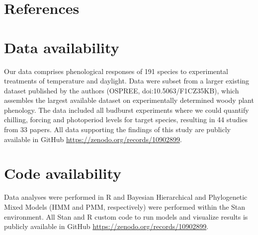 \documentclass{article}
\begin{document}
\clearpage


\section*{References} 




\section*{Data availability}
Our data comprises phenological responses of 191 species to experimental treatments of temperature and daylight. Data were subset from a larger existing dataset published by the authors (OSPREE, doi:10.5063/F1CZ35KB), which assembles the largest available dataset on experimentally determined woody plant phenology. The data included all budburst experiments where we could quantify chilling, forcing and photoperiod levels for target species, resulting in 44 studies from 33 papers. All data supporting the findings of this study are publicly available in GitHub \url{https://zenodo.org/records/10902899}.

\section*{Code availability}
Data analyses were performed in R and Bayesian Hierarchical and Phylogenetic Mixed Models (HMM and PMM, respectively) were performed within the Stan environment. All Stan and R custom code to run models and visualize results is publicly available in GitHub \url{https://zenodo.org/records/10902899}.
\end{document}
